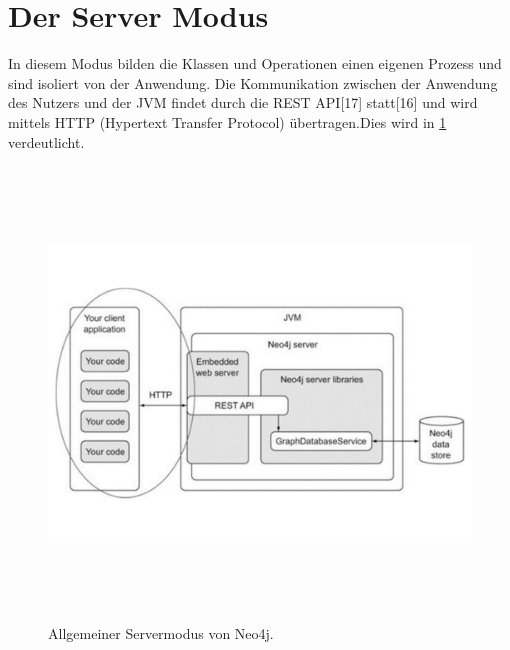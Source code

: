 \section{Der Server Modus}

In diesem Modus bilden die Klassen und Operationen einen eigenen Prozess und sind isoliert von der Anwendung. Die Kommunikation zwischen der Anwendung des Nutzers und der JVM findet durch die REST API[17] statt[16] und wird mittels HTTP (Hypertext Transfer Protocol) übertragen.Dies wird in \ref{fig:Embedded} verdeutlicht.
\begin{figure}[th]
	\centering
	\includegraphics [width=14cm, height=12cm]{Figures/Server}
	\caption[Architecture]{Allgemeiner Servermodus von Neo4j.}
	\label{fig:Embedded}
\end{figure}